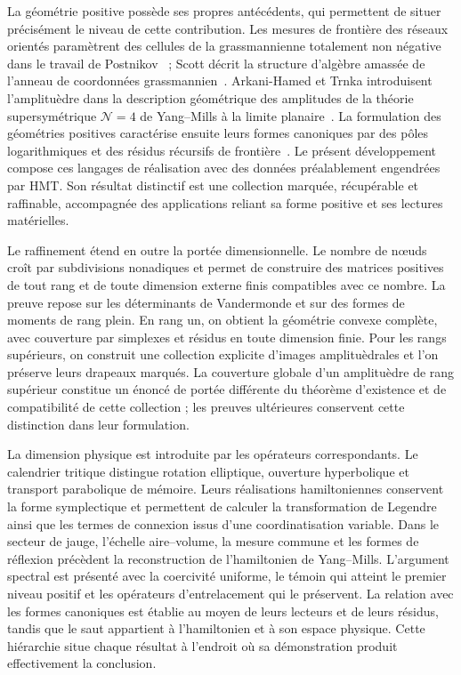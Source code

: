 La géométrie positive possède ses propres antécédents, qui permettent de situer précisément le niveau de cette contribution. Les mesures de frontière des réseaux orientés paramètrent des cellules de la grassmannienne totalement non négative dans le travail de Postnikov~\cite{postnikov} ; Scott décrit la structure d'algèbre amassée de l'anneau de coordonnées grassmannien~\cite{scott}. Arkani-Hamed et Trnka introduisent l'amplituèdre dans la description géométrique des amplitudes de la théorie supersymétrique \(\mathcal N=4\) de Yang--Mills à la limite planaire~\cite{amplituhedron}. La formulation des géométries positives caractérise ensuite leurs formes canoniques par des pôles logarithmiques et des résidus récursifs de frontière~\cite{positive}. Le présent développement compose ces langages de réalisation avec des données préalablement engendrées par HMT. Son résultat distinctif est une collection marquée, récupérable et raffinable, accompagnée des applications reliant sa forme positive et ses lectures matérielles.

Le raffinement étend en outre la portée dimensionnelle. Le nombre de nœuds croît par subdivisions nonadiques et permet de construire des matrices positives de tout rang et de toute dimension externe finis compatibles avec ce nombre. La preuve repose sur les déterminants de Vandermonde et sur des formes de moments de rang plein. En rang un, on obtient la géométrie convexe complète, avec couverture par simplexes et résidus en toute dimension finie. Pour les rangs supérieurs, on construit une collection explicite d'images amplituèdrales et l'on préserve leurs drapeaux marqués. La couverture globale d'un amplituèdre de rang supérieur constitue un énoncé de portée différente du théorème d'existence et de compatibilité de cette collection ; les preuves ultérieures conservent cette distinction dans leur formulation.

La dimension physique est introduite par les opérateurs correspondants. Le calendrier tritique distingue rotation elliptique, ouverture hyperbolique et transport parabolique de mémoire. Leurs réalisations hamiltoniennes conservent la forme symplectique et permettent de calculer la transformation de Legendre ainsi que les termes de connexion issus d'une coordinatisation variable. Dans le secteur de jauge, l'échelle aire--volume, la mesure commune et les formes de réflexion précèdent la reconstruction de l'hamiltonien de Yang--Mills. L'argument spectral est présenté avec la coercivité uniforme, le témoin qui atteint le premier niveau positif et les opérateurs d'entrelacement qui le préservent. La relation avec les formes canoniques est établie au moyen de leurs lecteurs et de leurs résidus, tandis que le saut appartient à l'hamiltonien et à son espace physique. Cette hiérarchie situe chaque résultat à l'endroit où sa démonstration produit effectivement la conclusion.

